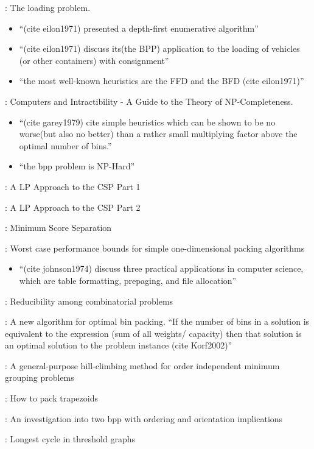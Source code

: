 \documentclass[oribibl]{llncs}
\begin{document}
\cite{eilon1971}: The loading problem. 
\begin{itemize}
	\item ``(cite eilon1971) presented a depth-first enumerative algorithm''
	\item ``(cite eilon1971) discuss its(the BPP) application to the loading of vehicles (or other containers) with consignment'' 
	\item ``the most well-known heuristics are the FFD and the BFD (cite eilon1971)''
\end{itemize}
\cite{garey1979}: Computers and Intractibility - A Guide to the Theory of NP-Completeness. 
\begin{itemize}
	\item ``(cite garey1979) cite simple heuristics which can be shown to be no
	worse(but also no better) than a rather small multiplying factor above the optimal number of bins.''
	\item ``the bpp problem is NP-Hard''
\end{itemize}

\cite{gilmore1961}: A LP Approach to the CSP Part 1

\cite{gilmore1963}: A LP Approach to the CSP Part 2

\cite{goulimis2004}: Minimum Score Separation

\cite{johnson1974}: Worst case performance bounds for simple one-dimensional packing algorithms
\begin{itemize}
	\item ``(cite johnson1974) discuss three practical applications in computer science, which are table formatting, prepaging, and file allocation''
\end{itemize}

\cite{karp1972}: Reducibility among combinatorial problems

\cite{korf2002}: A new algorithm for optimal bin packing. ``If the number of bins in a solution is equivalent to the expression (sum of all weights/ capacity) then that solution is an optimal solution to the problem instance (cite Korf2002)'' 

\cite{lewis2009}: A general-purpose hill-climbing method for order independent minimum grouping problems

\cite{lewis2017}: How to pack trapezoids

\cite{lewis2011}: An investigation into two bpp with ordering and orientation implications

\cite{mahadev1994}: Longest cycle in threshold graphs
\end{document}
